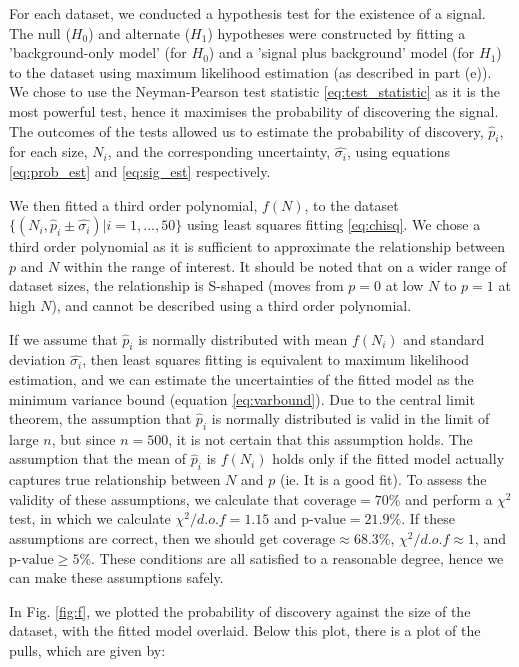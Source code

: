 \documentclass{article}
\begin{document}
For each dataset, we conducted a hypothesis test for the existence of a signal. The null ($H_0$) and alternate ($H_1$) hypotheses were constructed by fitting a 'background-only model' (for $H_0$) and a 'signal plus background' model (for $H_1$) to the dataset using maximum likelihood estimation (as described in part (e)). We chose to use the Neyman-Pearson test statistic \ref{eq:test_statistic} as it is the most powerful test, hence it maximises the probability of discovering the signal. The outcomes of the tests allowed us to estimate the probability of discovery, $\hat{p}_i$, for each size, $N_i$, and the corresponding uncertainty, $\hat{\sigma_i}$, using equations \ref{eq:prob_est} and \ref{eq:sig_est} respectively. 

We then fitted a third order polynomial, $f(N)$, to the dataset $\{(N_i, \hat{p}_i \pm \hat{\sigma_i})| i = 1, ..., 50\}$ using least squares fitting \ref{eq:chisq}. We chose a third order polynomial as it is sufficient to approximate the relationship between $p$ and $N$ within the range of interest. It should be noted that on a wider range of dataset sizes, the relationship is S-shaped (moves from $p=0$ at low $N$ to $p=1$ at high $N$), and cannot be described using a third order polynomial. 

If we assume that $\hat{p}_i$ is normally distributed with mean $f(N_i)$ and standard deviation $\hat{\sigma_i}$, then least squares fitting is equivalent to maximum likelihood estimation, and we can estimate the uncertainties of the fitted model as the minimum variance bound (equation \ref{eq:varbound}). Due to the central limit theorem, the assumption that $\hat{p}_i$ is normally distributed is valid in the limit of large $n$, but since $n = 500$, it is not certain that this assumption holds. The assumption that the  mean of $\hat{p}_i$ is $f(N_i)$ holds only if the fitted model actually captures true relationship between $N$ and $p$ (ie. It is a good fit). To assess the validity of these assumptions, we calculate that $\text{coverage} = 70\%$ and perform a $\chi^2$ test, in which we calculate $\chi^2/d.o.f = 1.15$ and $\text{p-value} = 21.9\%$. If these assumptions are correct, then we should get $\text{coverage} \approx68.3\%$, $\chi^2/d.o.f \approx 1$, and $\text{p-value} \geq 5\%$. These conditions are all satisfied to a reasonable degree, hence we can make these assumptions safely. 

In Fig. \ref{fig:f}, we plotted the probability of discovery against the size of the dataset, with the fitted model overlaid. Below this plot, there is a plot of the pulls, which are given by:
\end{document}
